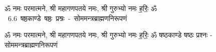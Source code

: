 \documentclass[17pt]{extarticle}
\begin{document}
\begin{titlepage}
    \begin{center}
 
\begin{sanskrit}
    { \Large
    ॐ नमः परमात्मने, श्री महागणपतये नमः, श्री गुरुभ्यो नमः
ह॒रिः॒ ॐ 
    }
    \\
    \vspace{2.5cm}
    \mbox{ \Huge
    6.6       षष्ठकाण्डे षष्ठः प्रश्नः - सोममन्त्रब्राह्मणनिरूपणं   }
\end{sanskrit}
\end{center}

\end{titlepage}
\tableofcontents

ॐ नमः परमात्मने, श्री महागणपतये नमः, श्री गुरुभ्यो नमः
ह॒रिः॒ ॐ        षष्ठकाण्डे षष्ठः प्रश्नः - सोममन्त्रब्राह्मणनिरूपणं \newline

\end{document}
